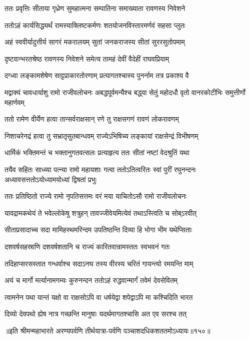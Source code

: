 \twolineshloka
{ततः प्रवृत्तिः सीताया गृध्रेण सुमहात्मना}
{सम्पातिना समाख्याता रावणस्य निवेशने}


\twolineshloka
{ततोऽहं कार्यसिद्ध्यर्थं रामस्याक्लिष्टकर्मणः}
{शतयोजनविस्तारमर्णवं सहसा प्लुतः}


\twolineshloka
{अहं स्ववीर्यादुत्तीर्य सागरं मकरालयम्}
{सुतां जनकराजस्य सीतां सुररसुतोपमाम्}


\twolineshloka
{दृष्टवान्भरतश्रेष्ठ रावणस्य निवेशने}
{समेत्य तामहं देवीं वैदेहीं राघवप्रियाम्}


\twolineshloka
{दग्ध्वा लङ्कामशेषेण साट्टप्राकारतोरणाम्}
{प्रत्यागतश्चास्य पुनर्नाम तत्र प्रकाश्य वै}


\threelineshloka
{मद्वाक्यं चावधार्याशु रामो राजीवलोचनः}
{अबद्धपूर्वमन्यैश्च बद्ध्वा सेतुं महोदधौ}
{वृतो वानरकोटीभिः समुत्तीर्णो महार्णवम्}


\twolineshloka
{ततो रामेण वीर्येण हत्वा तान्सर्वराक्षसान्}
{रणे तु राक्षसगणं रावणं लोकरावणम्}


\twolineshloka
{निशाचरेनद्रं हत्वा तु सभ्रातृसुतबान्धवम्}
{राज्येऽभिषिच्य लङ्कायां राक्षसेन्द्रं विभीषणम्}


\twolineshloka
{धार्मिकं भक्तिमन्तं च भक्तानुगतवत्सलः}
{प्रत्याहृत्य ततः सीतां नष्टां वेदश्रुतिं यथा}


\threelineshloka
{तयैव सहितः साध्व्या पत्न्या रामो महायशाः}
{गत्वा ततोऽतित्वरितः स्वां पुरीं रघुनन्दनः}
{अध्यावसत्ततोऽयोध्यामयोध्यां द्विषतां प्रभुः}


\twolineshloka
{ततः प्रतिष्ठितो राज्ये रामो नृपतिसत्तमः}
{वरं मया याचितोऽसौ रामो राजीवलोचनः}


\twolineshloka
{यावद्रामकथेयं ते भवेल्लोकेषु शत्रुहन्}
{तावज्जीवेयमित्येवं तथाऽस्त्विति च सोब्ऽरवीत्}


\twolineshloka
{सीताप्रसादाच्च सदा मामिहस्थमरिन्दम}
{उपतिष्ठन्ति दिव्या हि भोगा भीम यथेप्सिताः}


\twolineshloka
{दशवर्षसहस्राणि दशवर्षशतानि च}
{राज्यं कारितवान्रामस्ततः स्वभवनं गतः}


\twolineshloka
{तदिहाप्सरसस्तात गन्धर्वाश्च सदाऽनघ}
{तस्य वीरस्य चरितं गायन्त्यो रमयन्ति माम्}


\twolineshloka
{अयं च मार्गो मर्त्यानामगम्यः कुरुनन्दन}
{ततोऽहं रुद्धवान्मार्गं तवेमं देवसेवितम्}


\twolineshloka
{त्वामनेन पथा यान्तं यक्षो वा राक्षसोऽपि वा}
{धर्षयेद्वा शपेद्वाऽपि मा कश्चिदिति भारत}


\twolineshloka
{दिव्यो देवपथो ह्येष नात्र गच्छन्ति मानुषाः}
{यदर्थमागतश्चासि अत एव सरश्च तत्}

॥इति श्रीमन्महाभारते अरण्यपर्वणि तीर्थयात्रा-पर्वणि पञ्चाशदधिकशततमोऽध्यायः॥१५०॥

\closesection